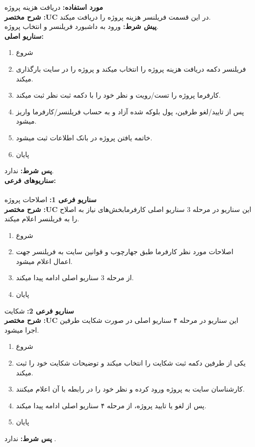 \documentclass[20pt,a5paper]{report}
\begin{document}
\noindent \textbf{مورد استفاده:}
دریافت هزینه پروژه
\\
\textbf{شرح مختصر :UC}
در این قسمت فریلنسر هزینه پروژه را دریافت میکند.
\\
\textbf{پيش شرط:}
ورود به داشبورد فریلنسر و انتخاب پروژه.
\\
\textbf{سناريو اصلی:}
\begin{enumerate}
\item
شروع
\item
فریلنسر دکمه دریافت هزینه پروژه را انتخاب میکند و پروژه را در سایت بارگذاری میکند.
\item
کارفرما پروژه را تست/رویت و نظر خود را با دکمه ثبت نظر ثبت میکند.
\item
پس از تایید/لغو طرفین، پول بلوکه شده آزاد و به حساب فریلنسر/کارفرما واریز میشود.
\item
خاتمه یافتن پروژه در بانک اطلاعات ثبت میشود.
\item
پایان
\end{enumerate}
\textbf{پس شرط:}
ندارد.
\\
\textbf{سناريوهای فرعی:}
\\ \\
\textbf{سناريو فرعی 1:}
اصلاحات پروژه
\\
\textbf{شرح مختصر :UC}
این سناریو در مرحله 3 سناریو اصلی کارفرمابخش‌های نیاز به اصلاح را به فریلنسر اعلام میکند.
\begin{enumerate}
\item
شروع
\item
اصلاحات مورد نظر کارفرما طبق جهارچوب و قوانین سایت به فریلنسر جهت اعمال اعلام میشود.
\item
از مرحله 3 سناریو اصلی ادامه پیدا میکند.
\item
پایان
\end{enumerate}
\textbf{سناريو فرعی 2:}
شکایت
\\
\textbf{شرح مختصر :UC}
این سناریو در مرحله ۴ سناریو اصلی در صورت شکایت طرفین اجرا میشود.
\begin{enumerate}
\item
شروع
\item
یکی از طرفین دکمه ثبت شکایت را انتخاب میکند و توضیحات شکایت خود را ثبت میکند.
\item
کارشناسان سایت به پروژه ورود کرده و نظر خود را در رابطه با آن اعلام میکنند.
\item
پس از لغو یا تایید پروژه، از مرحله ۴ سناریو اصلی ادامه پیدا میکند.
\item
پایان
\end{enumerate}

\textbf{پس شرط:}
ندارد .


\centering
\vfill
\lr{\LaTeX}
\end{document}
